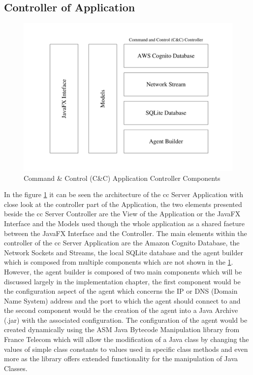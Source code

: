\newpage

\subsection{Controller of Application}

\begin{figure}[h]
    \centering
    \includegraphics[width=1.0\textwidth]{images/command-and-control-controller.pdf}
    \captionsetup{justification=centering}
    \caption[Command \& Control Controller Components]{Command \& Control (C\&C) Application Controller Components}
    \label{fig:command-controller}
\end{figure}

In the figure \ref{fig:command-controller} it can be seen the architecture of the \acrfull{cc}
Server Application with close look at the controller part of the Application, the two
elements presented beside the \acrfull{cc} Server Controller are the View of the Application
or the JavaFX Interface and the Models used though the whole application as a shared
faeture between the JavaFX Interface and the Controller.
The main elements within the controller of the \acrfull{cc} Server Application are the Amazon Cognito Database,
the Network Sockets and Streams, the local SQLite database and the agent builder which
is composed from multiple components which are not shown in the \ref{fig:command-controller}.
However, the agent builder is composed of two main components which will be discussed largely
in the implementation chapter, the first component would be the configuration aspect of the agent
which concerns the IP or DNS (Domain Name System) address and the port to which the agent
should connect to and the second component would be the creation of the agent into a
Java Archive (.jar) with the associated configuration. The configuration of the agent
would be created dynamically using the ASM Java Bytecode Manipulation library from
France Telecom which will allow the modification of a Java class by changing the values
of simple class constants to values used in specific class methods and even more as the
library offers extended functionality for the manipulation of Java Classes.

